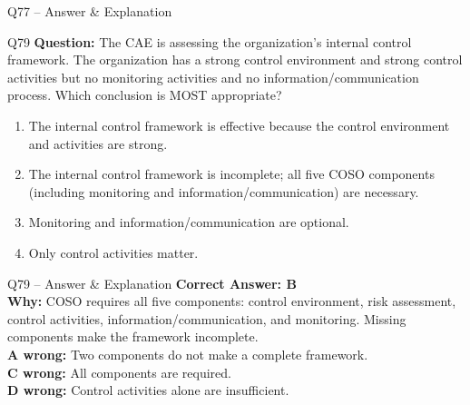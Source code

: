 \documentclass[aspectratio=169,10pt]{beamer}
\begin{document}
\begin{frame}[t]{Q77 -- Answer \& Explanation}
	\begin{frame}[t]{Q79}
		\small
		\textbf{Question:} The CAE is assessing the organization's internal control framework. The organization has a strong control environment and strong control activities but no monitoring activities and no information/communication process. Which conclusion is MOST appropriate?
		\begin{enumerate}[label=\Alph*.,itemsep=1pt,topsep=2pt]
			\item The internal control framework is effective because the control environment and activities are strong.
			\item The internal control framework is incomplete; all five COSO components (including monitoring and information/communication) are necessary.
			\item Monitoring and information/communication are optional.
			\item Only control activities matter.
		\end{enumerate}
	\end{frame}
	
	\begin{frame}[t]{Q79 -- Answer \& Explanation}
		\small
		\textbf{Correct Answer: B} \\[4pt]
		\textbf{Why:} COSO requires all five components: control environment, risk assessment, control activities, information/communication, and monitoring. Missing components make the framework incomplete. \\[4pt]
		\textbf{A wrong:} Two components do not make a complete framework. \\[2pt]
		\textbf{C wrong:} All components are required. \\[2pt]
		\textbf{D wrong:} Control activities alone are insufficient.
	\end{frame}
	

\end{frame}
\end{document}
